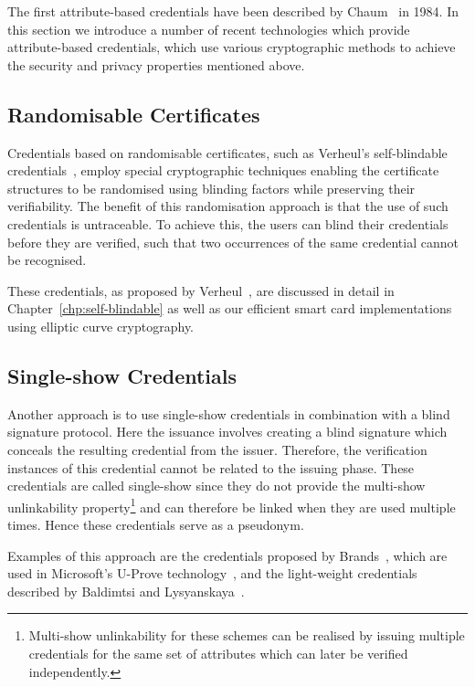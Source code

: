 The first attribute-based credentials have been described by
Chaum~\cite{Chaum1985} in 1984. In this section we introduce a number of recent
technologies which provide attribute-based credentials, which use various
cryptographic methods to achieve the security and privacy properties mentioned
above.

\subsection{Randomisable Certificates}

Credentials based on randomisable certificates, such as Verheul's self-blindable
credentials~\cite{Verheul01}, employ special cryptographic techniques enabling
the certificate structures to be randomised using blinding factors while
preserving their verifiability. The benefit of this randomisation approach is
that the use of such credentials is untraceable. To achieve this, the users can
blind their credentials before they are verified, such that two occurrences of
the same credential cannot be recognised.

These credentials, as proposed by Verheul~\cite{Verheul01}, are discussed in
detail in Chapter~\ref{chp:self-blindable} as well as our efficient smart card
implementations~\cite{BatinaHJMV10,HoepmanJV10} using elliptic curve
cryptography.

\subsection{Single-show Credentials}

Another approach is to use single-show credentials in combination with a
blind signature protocol. Here the issuance involves creating a blind signature
which conceals the resulting credential from the issuer. Therefore, the
verification instances of this credential cannot be related to the issuing
phase. These credentials are called single-show since they do not provide the
multi-show unlinkability property\footnote{Multi-show unlinkability for these
schemes can be realised by issuing multiple credentials for the same set of
attributes which can later be verified independently.} and can therefore be
linked when they are used multiple times. Hence these credentials serve as a
pseudonym.

Examples of this approach are the credentials proposed by
Brands~\cite{Brands2000}, which are used in Microsoft's U-Prove
technology~\cite{U-Prove_Crypto2013}, and the light-weight credentials described
by Baldimtsi and Lysyanskaya~\cite{BaLy2012}.

